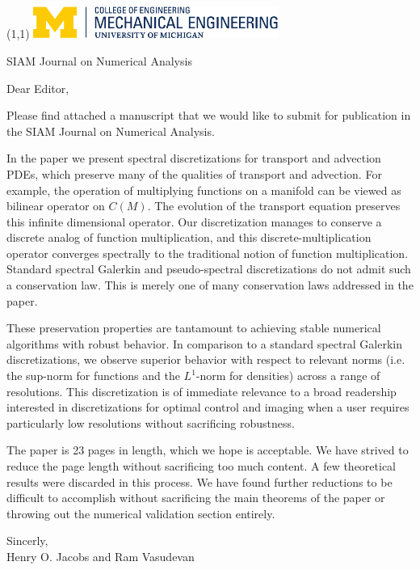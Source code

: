 \documentclass{letter}
\begin{document}
\begin{textblock}{1}(1,1)
  \includegraphics[width=80mm]{CoE-ME-horiz-PMS}
\end{textblock}
\begin{letter}{SIAM Journal on Numerical Analysis}
\opening{Dear Editor,}
Please find attached a manuscript that we would like to submit for
publication in the SIAM Journal on Numerical Analysis.

In the paper we present spectral discretizations for transport and advection PDEs, which preserve many of the qualities of transport and advection.
For example, the operation of multiplying functions on a manifold can be viewed as bilinear operator on $C(M)$.
The evolution of the transport equation preserves this infinite dimensional operator.
Our discretization manages to conserve a discrete analog of function multiplication, and this discrete-multiplication operator converges spectrally to the traditional notion of function multiplication.
Standard spectral Galerkin and pseudo-spectral discretizations do not admit such a conservation law.
This is merely one of many conservation laws addressed in the paper.

These preservation properties are tantamount to achieving stable numerical algorithms with robust behavior.
In comparison to a standard spectral Galerkin discretizations, we observe superior behavior with respect to relevant norms (i.e. the sup-norm for functions and the $L^{1}$-norm for densities) across a range of resolutions.
This discretization is of immediate relevance to a broad readership interested in discretizations for optimal control and imaging when a user requires particularly low resolutions without sacrificing robustness.

The paper is 23 pages in length, which we hope is acceptable.
We have strived to reduce the page length without sacrificing too much content.
A few theoretical results were discarded in this process.
We have found further reductions to be difficult to accomplish without sacrificing the main theorems of the paper or throwing out the numerical validation section entirely.

\closing{Sincerly,\\
Henry O. Jacobs and Ram Vasudevan
}

\end{letter}
\end{document}
